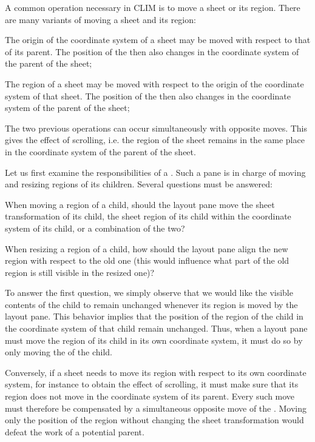 A common operation necessary in CLIM is to move a sheet or
its region.  There are many variants of moving a sheet and its
region:

\begin{itemize0}
\item The origin of the coordinate system of a sheet may be moved with
respect to that of its parent.  The position of the  then also changes in the coordinate system of the parent of
the sheet;
\item The region of a sheet may be moved with respect to the origin of
the coordinate system of that sheet.  The position of the  then also changes in the coordinate system of the parent of
the sheet;
\item The two previous operations can occur simultaneously with
opposite moves.  This gives the effect of scrolling, i.e. the region
of the sheet remains in the same place in the coordinate system of the
parent of the sheet.
\end{itemize0}

Let us first examine the responsibilities of a .
Such a pane is in charge of moving and resizing regions of its
children.  Several questions must be answered:

\begin{itemize0}
\item When moving a region of a child, should the layout pane move
the sheet transformation of its child, the sheet region of its child
within the coordinate system of its child, or a combination of the
two?
\item When resizing a region of a child, how should the layout pane
align the new region with respect to the old one (this would influence
what part of the old region is still visible in the resized one)?
\end{itemize0}

To answer the first question, we simply observe that we would like the
visible contents of the child to remain unchanged whenever its region
is moved by the layout pane.  This behavior implies that the position
of the region of the child in the coordinate system of that child
remain unchanged.  Thus, when a layout pane must move the region of
its child in its own coordinate system, it must do so by only moving
the  of the child.

Conversely, if a sheet needs to move its region with respect to its
own coordinate system, for instance to obtain the effect of scrolling,
it must make sure that its region does not move in the coordinate
system of its parent.  Every such move must therefore be compensated
by a simultaneous opposite move of the .
Moving only the position of the region without changing the sheet
transformation would defeat the work of a potential  parent. 

